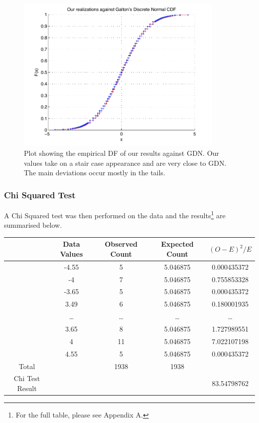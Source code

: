 \begin{figure}[thp]
\begin{center}
\includegraphics[width=10cm]{figures/GaltonDice_our_realizations_against_Galtons_discrete_normal.pdf}
\caption{Plot showing the empirical DF of our results against GDN. Our values take on a stair case appearance and are very close to GDN. The main deviations occur mostly in the tails.}
\end{center}
\end{figure}
  

\subsubsection*{Chi Squared Test}
A Chi Squared test was then performed on the data and the results\footnote{For the full table, please see Appendix A.} are summarised below. 
	
\begin{tabular}{|c|c|c|c|c|}\hline
&Data Values	&Observed Count&	Expected Count&	$(O-E)^2/E$\\ \hline
	&-4.55	&5&	5.046875&	0.000435372\\
	&-4&	7	&5.046875&	0.755853328\\
	&-3.65	&5&	5.046875&	0.000435372\\
	&3.49&	6	&5.046875	&0.180001935\\
	&\ldots &	\ldots&\ldots&\ldots\\
	&3.65&	8	&5.046875	&1.727989551\\
	&4	&11	&5.046875&7.022107198\\
	&4.55&	5	&5.046875	&0.000435372\\
Total	&& 	1938	&1938	 &\\\hline
Chi Test Result	 	 &&&&	 	83.54798762\\\hline
\end{tabular}



